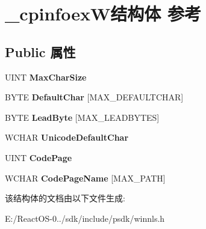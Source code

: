 \hypertarget{struct__cpinfoex_w}{}\section{\+\_\+cpinfoex\+W结构体 参考}
\label{struct__cpinfoex_w}
\subsection*{Public 属性}
\begin{DoxyCompactItemize}
\item 
\mbox{\label{struct__cpinfoex_w_a8d0a20234da7709d808a23a4569f3e61}} 
U\+I\+NT {\bfseries Max\+Char\+Size}
\item 
\mbox{\label{struct__cpinfoex_w_a3c131727cf021aa57541d51b9382223c}} 
B\+Y\+TE {\bfseries Default\+Char} \mbox{[}M\+A\+X\+\_\+\+D\+E\+F\+A\+U\+L\+T\+C\+H\+AR\mbox{]}
\item 
\mbox{\label{struct__cpinfoex_w_a8e0135208883c12e37408a81b0d8ec01}} 
B\+Y\+TE {\bfseries Lead\+Byte} \mbox{[}M\+A\+X\+\_\+\+L\+E\+A\+D\+B\+Y\+T\+ES\mbox{]}
\item 
\mbox{\label{struct__cpinfoex_w_a37654a88aed381290ecd6e6d3a7cafac}} 
W\+C\+H\+AR {\bfseries Unicode\+Default\+Char}
\item 
\mbox{\label{struct__cpinfoex_w_ab10a6e1b8b7d89e3abe18cab0cad419b}} 
U\+I\+NT {\bfseries Code\+Page}
\item 
\mbox{\label{struct__cpinfoex_w_a7470dea6133012acd914fc521b4ebff8}} 
W\+C\+H\+AR {\bfseries Code\+Page\+Name} \mbox{[}M\+A\+X\+\_\+\+P\+A\+TH\mbox{]}
\end{DoxyCompactItemize}


该结构体的文档由以下文件生成\+:\begin{DoxyCompactItemize}
\item 
E\+:/\+React\+O\+S-\/0../sdk/include/psdk/winnls.\+h\end{DoxyCompactItemize}
